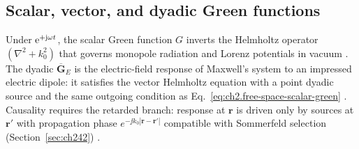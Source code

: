 \subsection{Scalar, vector, and dyadic Green functions}
\label{sec:ch231}
Under $\mathrm{e}^{+\mathrm{j}\omega t}$, the scalar Green function $G$ inverts the Helmholtz operator $(\nabla^2+k_0^2)$ that governs monopole radiation and Lorenz potentials in vacuum \cite{stratton1941,jackson1999}. The dyadic $\overline{\mathbf{G}}_{E}$ is the electric-field response of Maxwell's system to an impressed electric dipole: it satisfies the vector Helmholtz equation with a point dyadic source and the same outgoing condition as Eq.~\eqref{eq:ch2.free-space-scalar-green} \cite{tai1994}. Causality requires the retarded branch: response at $\mathbf{r}$ is driven only by sources at $\mathbf{r}'$ with propagation phase $e^{-\jj k_0|\mathbf{r}-\mathbf{r}'|}$ compatible with Sommerfeld selection (Section~\ref{sec:ch242}) \cite{sommerfeld1949}.

